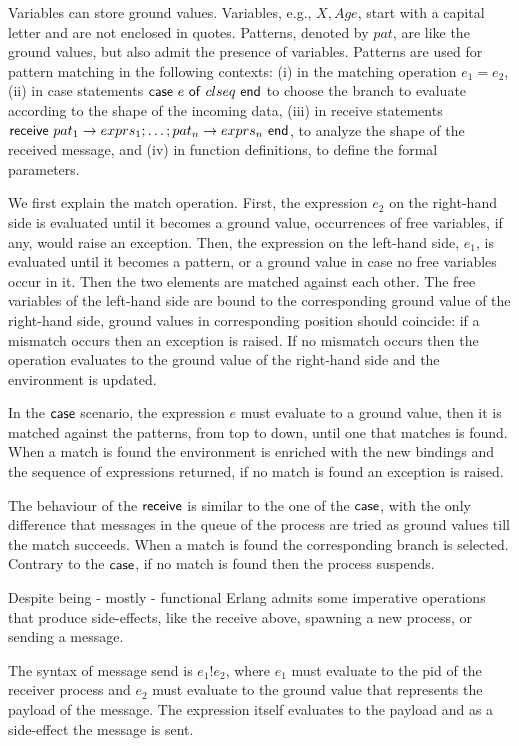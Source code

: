 \documentclass{article}[12pt,a4paper]
\theoremstyle{definition}
\begin{document}
Variables can store ground values. Variables, e.g., $X,Age$, start with a capital letter and
are not enclosed in quotes.
Patterns, denoted by $pat$, are like the ground values,
but also admit the presence of variables. Patterns are used for pattern matching in the following contexts: (i) in the matching operation $e_1 = e_2$, (ii) in case statements $\mathsf{case}~e~\mathsf{of}~clseq~\mathsf{end}$ to choose the branch
to evaluate according to the shape of the incoming data,
(iii) in receive
statements $\mathsf{receive}~pat_1 \rightarrow exprs_1; \ldots; pat_n
\rightarrow exprs_n~\mathsf{end}$, to analyze the shape of the received message, and
(iv) in function
definitions, to define the formal parameters. 

We first explain the match operation. First, the expression $e_2$ on
the right-hand side is evaluated until it becomes a ground value,
occurrences of free variables, if any, would raise an exception.
Then, the expression on the left-hand side, $e_1$, is evaluated until
it becomes a pattern, or a ground value in case no free variables
occur in it. Then the
two elements are matched against each other. The free variables of the
left-hand side are bound to the corresponding ground value of the right-hand
side, ground values in corresponding position should coincide: if a mismatch occurs then an exception
is raised. If no mismatch occurs then the operation evaluates to the ground
value of the right-hand side and the environment is updated.

In the $\mathsf{case}$ scenario, the expression $e$ must evaluate to a ground value, then it is matched against the patterns, from
top to down, until one that matches is found. When a match is found the environment
is enriched with the new bindings and the sequence of expressions returned, if
no match is found an exception is raised.

The behaviour of the $\mathsf{receive}$ is similar to the one of the
$\mathsf{case}$, with the only difference that messages in the queue of
the process are tried as ground values till the match succeeds.
When a match is found the corresponding branch
is selected.  Contrary to the $\mathsf{case}$, if no match is found
then the process suspends.

Despite being - mostly - functional Erlang
admits some imperative operations that produce side-effects, like the receive
above, spawning a new process, or sending a message. 

The syntax of message send is $e_1!e_2$, where $e_1$ must
evaluate to the pid of the receiver process and $e_2$ must evaluate to the ground value that represents the payload of the message. The expression itself evaluates to
the payload and as a side-effect the message is sent.
\end{document}

